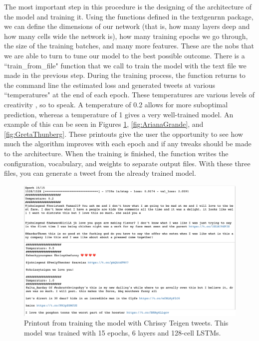 \documentclass[%
 reprint,
 amsmath,amssymb,
 aps,
]{revtex4-2}
\begin{document}
The most important step in this procedure is the designing of the architecture of the model and training it. Using the functions defined in the textgenrnn package, we can define the dimensions of our network (that is, how many layers deep and how many cells wide the network is), how many training epochs we go through, the size of the training batches, and many more features. These are the nobs that we are able to turn to tune our model to the best possible outcome. There is a ``train\_from\_file" function that we call to train the model with the text file we made in the previous step. During the training process, the function returns to the command line the estimated loss and generated tweets at various ``temperatures" at the end of each epoch. These temperatures are various levels of creativity \cite{maxWoolfBlog}, so to speak. A temperature of 0.2 allows for more suboptimal prediction, whereas a temperature of 1 gives a very well-trained model. An example of this can be seen in Figures \ref{fig:ChrissyTeigen}, \ref{fig:ArianaGrande}, and \ref{fig:GretaThunberg}. These printouts give the user the opportunity to see how much the algorithm improves with each epoch and if any tweaks should be made to the architecture. When the training is finished, the function writes the configuration, vocabulary, and weights to separate output files. With these three files, you can generate a tweet from the already trained model. 

\begin{figure}[h]
    \centering
    \includegraphics[scale=0.28]{ChrissyTeigenResults.png}
    \caption{Printout from training the model with Chrissy Teigen tweets. This model was trained with 15 epochs, 6 layers and 128-cell LSTMs.}
    \label{fig:ChrissyTeigen}
\end{figure}
\end{document}
